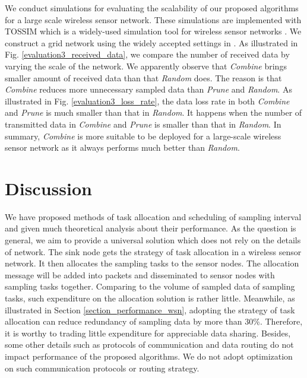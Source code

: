 \documentclass[prodmode,acmtosn]{acmsmall}
\begin{document}
We conduct simulations for evaluating the scalability of our proposed algorithms for a large scale wireless sensor network. These simulations are implemented with TOSSIM which is a widely-used simulation tool for wireless sensor networks \cite{2003_TOSSIM}. We construct a grid network using the widely accepted settings in \cite{1999_wideband_channel_measurement}. As illustrated in Fig. \ref{evaluation3_received_data}, we compare the number of received data by varying the scale of the network. We apparently observe that \emph{Combine} brings smaller amount of received data than that \emph{Random} does. The reason is that \emph{Combine} reduces more unnecessary sampled data than \emph{Prune} and \emph{Random}. As illustrated in Fig. \ref{evaluation3_loss_rate}, the data loss rate in both \emph{Combine} and \emph{Prune} is much smaller than that in \emph{Random}. It happens when the number of transmitted data in \emph{Combine} and \emph{Prune} is smaller than that in \emph{Random}. In summary, \emph{Combine} is more suitable to be deployed for a large-scale wireless sensor network as it always performs much better than \emph{Random}.

\section{Discussion}
\label{discussion}
We have proposed methods of task allocation and scheduling of sampling interval and given much theoretical analysis about their performance. As the question is general, we aim to provide a universal solution which does not rely on the details of network. The sink node gets the strategy of task allocation in a wireless sensor network. It then allocates the sampling tasks to the sensor nodes. The allocation message will be added into packets and disseminated to sensor nodes with sampling tasks together. Comparing to the volume of sampled data of sampling tasks, such expenditure on the allocation solution is rather little. Meanwhile, as illustrated in Section \ref{section_performance_wsn}, adopting the strategy of task allocation can reduce redundancy of sampling data by more than 30\%. Therefore, it is worthy to trading little expenditure for appreciable data sharing. Besides, some other details  such as protocols of communication and data routing do not impact performance of the proposed algorithms. We do not adopt optimization on such communication protocols or routing strategy.
\end{document}
